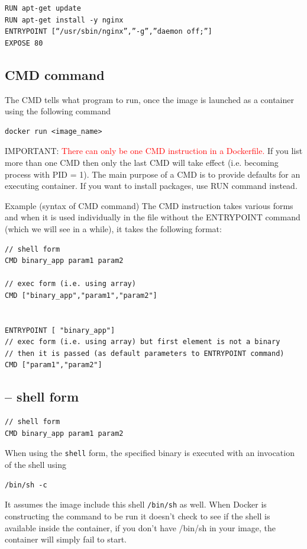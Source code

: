 \begin{verbatim}
RUN apt-get update
RUN apt-get install -y nginx
ENTRYPOINT [“/usr/sbin/nginx”,”-g”,”daemon off;”]
EXPOSE 80
\end{verbatim}



\subsection{CMD command}
\label{sec:Dockerfile-CMD}

The CMD tells what program to run, once the image is launched as a container using the following command
\begin{verbatim}
docker run <image_name>
\end{verbatim}

IMPORTANT: \textcolor{red}{There can only be one CMD instruction in a
Dockerfile.} If you list more than one CMD then only the last CMD will take
effect (i.e. becoming process with PID = 1). The main purpose of a CMD is to
provide defaults for an executing container. If you want to install packages,
use RUN command instead.


Example (syntax of CMD command) The CMD instruction takes various forms and when
it is used individually in the file without the ENTRYPOINT command (which we
will see in a while), it takes the following format:

\begin{verbatim}
// shell form
CMD binary_app param1 param2

// exec form (i.e. using array)
CMD ["binary_app","param1","param2"]


ENTRYPOINT [ "binary_app"]
// exec form (i.e. using array) but first element is not a binary
// then it is passed (as default parameters to ENTRYPOINT command)
CMD ["param1","param2"] 

\end{verbatim}

\subsection{-- shell form}

\begin{verbatim}
// shell form
CMD binary_app param1 param2

\end{verbatim}

When using the \verb!shell! form, the specified binary is executed with an invocation of the shell using
\begin{verbatim}
/bin/sh -c
\end{verbatim}
It assumes the image include this shell \verb!/bin/sh! as well. 
When Docker is constructing the command to be run it doesn't check to see if the
shell is available inside the container, if you don't have /bin/sh in your
image, the container will simply fail to start.


